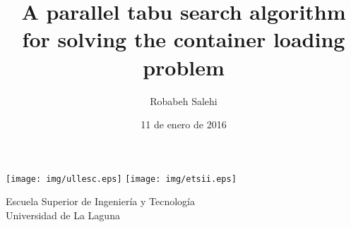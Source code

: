 \documentclass{beamer}
\title[Peresentacion de la asignatura CA ]{A parallel tabu search algorithm for solving the container loading problem}
\author[Autor]{Robabeh Salehi}
\institute[ULL]{Universidad de La Laguna}
\date{11 de enero de 2016}
\begin{document}
  
\begin{frame}

  \texttt{[image: img/ullesc.eps]}
  \hspace*{7.5cm}
  \texttt{[image: img/etsii.eps]}
  \titlepage

  \begin{scriptsize}
    \begin{center}
     Escuela Superior de Ingeniería y Tecnología \\
     Universidad de La Laguna
    \end{center}
  \end{scriptsize}

\end{frame}




\end{document}
